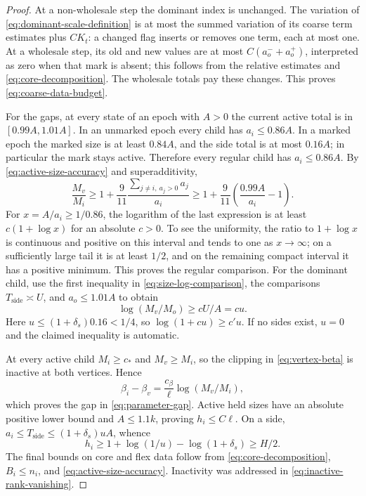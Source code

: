 \begin{proof}
At a non-wholesale step the dominant index is unchanged.  The variation
of \eqref{eq:dominant-scale-definition} is at most the summed variation
of its coarse term estimates plus $CK_t$: a changed flag inserts or
removes one term, each at most one.  At a wholesale step, its old and
new values are at most $C(a_o^-+a_o^+)$, interpreted as zero when that
mark is absent; this follows from the relative estimates and
\eqref{eq:core-decomposition}.  The wholesale totals pay these changes.
This proves \eqref{eq:coarse-data-budget}.

For the gaps, at every state of an epoch with $A>0$ the current active
total is in $[0.99A,1.01A]$.  In an unmarked epoch every child has
$a_i\le0.86A$.  In a marked epoch the marked size is at least $0.84A$,
and the side total is at most $0.16A$; in particular the mark stays
active.  Therefore every regular child has $a_i\le0.86A$.
By \eqref{eq:active-size-accuracy} and superadditivity,
\begin{equation}\label{eq:size-log-comparison}
 \frac{M_v}{M_i}\ge
 1+\frac9{11}\frac{\sum_{j\ne i,\ a_j>0}a_j}{a_i}
 \ge1+\frac9{11}\left(\frac{0.99A}{a_i}-1\right).
\end{equation}
For $x=A/a_i\ge1/0.86$, the logarithm of the last expression is
at least $c(1+\log x)$ for an absolute $c>0$.  To see the uniformity,
the ratio to $1+\log x$ is continuous and positive on this interval
and tends to one as $x\to\infty$; on a sufficiently large tail it is
at least $1/2$, and on the remaining compact interval it has a
positive minimum.  This proves the regular comparison.
For the dominant child, use the first inequality in
\eqref{eq:size-log-comparison}, the comparisons
$T_{\mathrm{side}}\asymp U$, and $a_o\le1.01A$ to obtain
\[
                 \log(M_v/M_o)\ge cU/A=cu.
\]
Here $u\le(1+\delta_s)0.16<1/4$, so $\log(1+cu)\ge c'u$.
If no sides exist, $u=0$ and the claimed inequality is automatic.

At every active child $M_i\ge c_*$ and $M_v\ge M_i$, so the clipping
in \eqref{eq:vertex-beta} is inactive at both vertices.  Hence
\[
               \beta_i-\beta_v
                  =\frac{c_\beta}{\ell}\log(M_v/M_i),
\]
which proves the gap in \eqref{eq:parameter-gap}.
Active held sizes have an absolute positive lower bound and
$A\le1.1k$, proving $h_i\le C\ell$.  On a side,
$a_i\le T_{\mathrm{side}}\le(1+\delta_s)uA$, whence
\[
 h_i\ge1+\log(1/u)-\log(1+\delta_s)\ge H/2.
\]
The final bounds on core and flex data follow from
\eqref{eq:core-decomposition}, $B_i\le n_i$, and
\eqref{eq:active-size-accuracy}.  Inactivity was addressed in
\eqref{eq:inactive-rank-vanishing}.
\end{proof}

